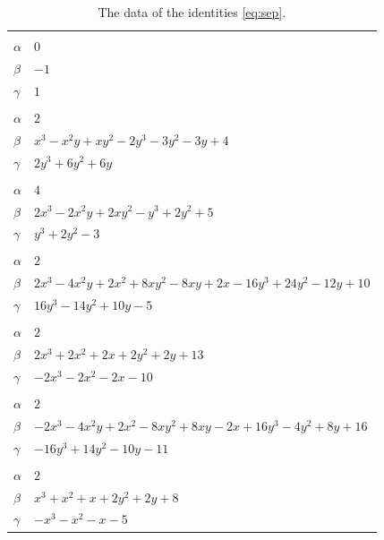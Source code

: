 \documentclass[11pt]{article}
\begin{document}
\begingroup\footnotesize
\setlength{\LTcapwidth}{\textwidth}
\begin{longtable}{@{}ll@{}}
\caption{The data of the identities \eqref{eq:sep}.}\label{tab:sep}\\
\hline\endfirsthead\hline\endhead\hline\endfoot
\multicolumn{2}{@{}l}{$\{i,j\}=\{0,2\}$, $k_{ij}=1$}\\
$\alpha$ & $0$\\
$\beta$ & $-1$\\
$\gamma$ & $1$\\
\addlinespace[3pt]
\multicolumn{2}{@{}l}{$\{i,j\}=\{1,2\}$, $k_{ij}=2$}\\
$\alpha$ & $2$\\
$\beta$ & $x^{3}-x^{2}y+xy^{2}-2y^{3}-3y^{2}-3y+4$\\
$\gamma$ & $2y^{3}+6y^{2}+6y$\\
\addlinespace[3pt]
\multicolumn{2}{@{}l}{$\{i,j\}=\{1,5\}$, $k_{ij}=2^{2}$}\\
$\alpha$ & $4$\\
$\beta$ & $2x^{3}-2x^{2}y+2xy^{2}-y^{3}+2y^{2}+5$\\
$\gamma$ & $y^{3}+2y^{2}-3$\\
\addlinespace[3pt]
\multicolumn{2}{@{}l}{$\{i,j\}=\{2,3\}$, $k_{ij}=2$}\\
$\alpha$ & $2$\\
$\beta$ & $2x^{3}-4x^{2}y+2x^{2}+8xy^{2}-8xy+2x-16y^{3}+24y^{2}-12y+10$\\
$\gamma$ & $16y^{3}-14y^{2}+10y-5$\\
\addlinespace[3pt]
\multicolumn{2}{@{}l}{$\{i,j\}=\{3,4\}$, $k_{ij}=2\cdot 3^{2}$}\\
$\alpha$ & $2$\\
$\beta$ & $2x^{3}+2x^{2}+2x+2y^{2}+2y+13$\\
$\gamma$ & $-2x^{3}-2x^{2}-2x-10$\\
\addlinespace[3pt]
\multicolumn{2}{@{}l}{$\{i,j\}=\{4,5\}$, $k_{ij}=2\cdot 3^{2}$}\\
$\alpha$ & $2$\\
$\beta$ & $-2x^{3}-4x^{2}y+2x^{2}-8xy^{2}+8xy-2x+16y^{3}-4y^{2}+8y+16$\\
$\gamma$ & $-16y^{3}+14y^{2}-10y-11$\\
\addlinespace[3pt]
\multicolumn{2}{@{}l}{$\{i,j\}=\{3,5\}$, $k_{ij}=2\cdot 3^{2}$}\\
$\alpha$ & $2$\\
$\beta$ & $x^{3}+x^{2}+x+2y^{2}+2y+8$\\
$\gamma$ & $-x^{3}-x^{2}-x-5$\\

\end{longtable}
\end{document}
